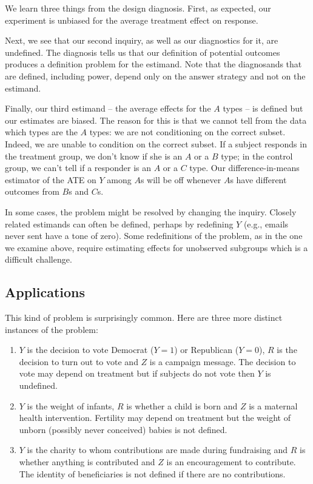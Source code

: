 \documentclass[11pt]{article}\usepackage[]{graphicx}\usepackage[]{color}
\begin{document}
We learn three things from the design diagnosis. First, as expected, our experiment is unbiased for the average treatment effect on response.

Next, we see that our second inquiry, as well as our diagnostics for it, are undefined. The diagnosis tells us that our definition of potential outcomes produces a definition problem for the estimand. Note that the diagnosands that are defined, including power, depend only on the answer strategy and not on the estimand.

Finally, our third estimand -- the average effects for the $A$ types -- is defined but our estimates are biased. The reason for this is that we cannot tell from the data which types are the $A$ types: we are not conditioning on the correct subset. Indeed, we are unable to condition on the correct subset. If a subject responds in the treatment group, we don't know if she is an $A$ or a $B$ type; in the control group, we can't tell if a responder is an $A$ or a $C$ type. Our difference-in-means estimator of the ATE on $Y$ among $A$s will be off whenever $A$s have different outcomes from $B$s and $C$s.

In some cases, the problem might be resolved by changing the inquiry. Closely related estimands can often be defined, perhaps by redefining $Y$ (e.g., emails never sent have a tone of zero). Some redefinitions of the problem, as in the one we examine above, require estimating effects for unobserved subgroups which is a difficult challenge. 

\smallskip\subsection*{Applications}

This kind of problem is surprisingly common. Here are three more distinct instances of the problem:

\begin{enumerate}
\item $Y$ is the decision to vote Democrat ($Y=1$) or Republican ($Y=0$), $R$ is the decision to turn out to vote and $Z$ is a campaign message. The decision to vote may depend on treatment but if subjects do not vote then $Y$ is undefined.
\item $Y$ is the weight of infants, $R$ is whether a child is born and $Z$ is a maternal health intervention. Fertility may depend on treatment but the weight of unborn (possibly never conceived) babies is not defined.
\item $Y$ is the charity to whom contributions are made during fundraising and $R$ is whether anything is contributed and $Z$ is an encouragement to contribute. The identity of beneficiaries is not defined if there are no contributions. 
\end{enumerate}
\end{document}
